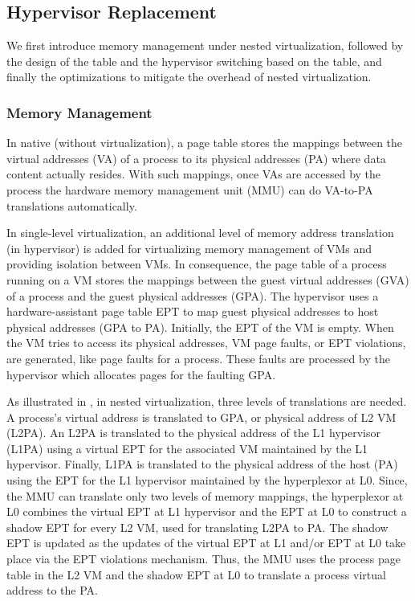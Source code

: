 \subsection{Hypervisor Replacement}
We first introduce memory management under nested virtualization, followed by the design of the \arch table and the hypervisor switching based on the \arch table, and finally the optimizations to mitigate the overhead of nested virtualization.

\subsubsection{Memory Management}
In native (without virtualization), a page table stores the mappings between the virtual addresses (VA) of a process to its physical addresses (PA) where data content actually resides. With such mappings, once VAs are accessed by the process the hardware memory management unit (MMU) can do VA-to-PA translations automatically. 

In single-level virtualization, an additional level of memory address translation (in hypervisor) is added for virtualizing memory management of VMs and providing isolation between VMs. In consequence, the page table of a process running on a VM stores the mappings between the guest virtual addresses (GVA) of a process and the guest physical addresses (GPA). The hypervisor uses a hardware-assistant page table EPT to map guest physical addresses to host physical addresses (GPA to PA). Initially, the EPT of the VM is empty. When the VM tries to access its physical addresses, VM page faults, or EPT violations, are generated, like page faults for a process. These faults are processed by the hypervisor which allocates pages for the faulting GPA. 

As illustrated in , in nested virtualization, three levels of translations are needed. A process's virtual address is translated to GPA, or physical address of L2 VM (L2PA). An L2PA is translated to the physical address of the L1 hypervisor (L1PA) using a virtual EPT for the associated VM maintained by the L1 hypervisor. Finally, L1PA is translated to the physical address of the host (PA) using the EPT for the L1 hypervisor maintained by the hyperplexor at L0. Since, the MMU can translate only two levels of memory mappings, the hyperplexor at L0 combines the virtual EPT at L1 hypervisor and the EPT at L0 to construct a shadow EPT for every L2 VM, used for translating L2PA to PA. The shadow EPT is updated as the updates of the virtual EPT at L1 and/or EPT at L0 take place via the EPT violations mechanism. Thus, the MMU uses the process page table in the L2 VM and the shadow EPT at L0 to translate a process virtual address to the PA.
 
